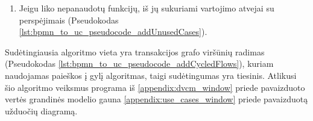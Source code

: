 \begin{enumerate}
	

	\item Jeigu liko nepanaudotų funkcijų, iš jų sukuriami vartojimo atvejai su perspėjimais (Pseudokodas \ref{lst:bpmn_to_uc_pseudocode_addUnusedCases}).

	
\end{enumerate}

Sudėtingiausia algoritmo vieta yra transakcijos grafo viršūnių radimas (Pseudokodas  \ref{lst:bpmn_to_uc_pseudocode_addCycledFlows}), kuriam naudojamas paieškos į gylį algoritmas, taigi sudėtingumas yra tiesinis. Atlikusi šio algoritmo veiksmus programa iš \ref{appendix:dvcm_window} priede pavaizduoto vertės grandinės modelio gauna \ref{appendix:use_cases_window} priede pavaizduotą užduočių diagramą.
